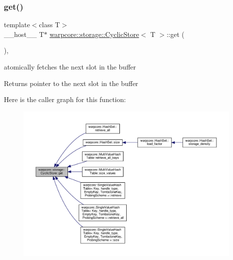 \subsubsection{\texorpdfstring{get()}{get()}}
{\footnotesize\ttfamily template$<$class T$>$ \\
\+\_\+\+\_\+host\+\_\+\+\_\+ T$\ast$ \hyperlink{classwarpcore_1_1storage_1_1CyclicStore}{warpcore\+::storage\+::\+Cyclic\+Store}$<$ T $>$\+::get (\begin{DoxyParamCaption}{ }\end{DoxyParamCaption})\hspace{0.3cm}{\ttfamily [inline]}, {\ttfamily [noexcept]}}



atomically fetches the next slot in the buffer 

\begin{DoxyReturn}{Returns}
pointer to the next slot in the buffer 
\end{DoxyReturn}
Here is the caller graph for this function\+:
\nopagebreak
\begin{figure}[H]
\begin{center}
\leavevmode
\includegraphics[width=350pt]{classwarpcore_1_1storage_1_1CyclicStore_afa6513c27f8e27b256b45d992ba4c820_icgraph}
\end{center}
\end{figure}
\mbox{\label{classwarpcore_1_1storage_1_1CyclicStore_ab6c224b2b5a49d93dc7e052ec7b8cc32}} 
